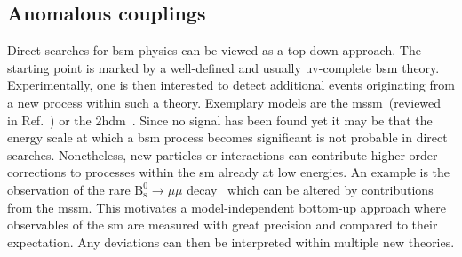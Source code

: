 

\subsection{Anomalous couplings}

Direct searches for \gls{bsm} physics can be viewed as a top-down approach. The starting point is marked by a well-defined and usually \gls{uv}-complete \gls{bsm} theory. Experimentally, one is then interested to detect additional events originating from a new process within such a theory. Exemplary models are the \gls{mssm}~(reviewed in Ref.~\cite{Csaki:1996ks}) or the \gls{2hdm}~\cite{Branco:2011iw}. Since no signal has been found yet it may be that the energy scale at which a \gls{bsm} process becomes significant is not probable in direct searches. Nonetheless, new particles or interactions can contribute higher-order corrections to processes within the \gls{sm} already at low energies. An example is the observation of the rare $\mathrm{B}^{0}_\mathrm{s}\to\mu\mu$ decay~\cite{CMS:2014xfa} which can be altered by contributions from the \gls{mssm}. This motivates a model-independent bottom-up approach where observables of the \gls{sm} are measured with great precision and compared to their expectation. Any deviations can then be interpreted within multiple new theories. 

